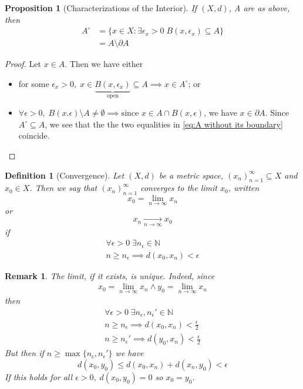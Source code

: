 \documentclass[11pt, oneside]{book}
\theoremstyle{break}
\newtheorem*{proof}{Proof}
\newtheorem{propo}{Proposition}[section]
\newtheorem*{remark}{Remark}
\newtheorem{defn}{Definition}[section]
\newcommand{\bb}[1]{\mathbb{#1}}			%
\begin{document}
\begin{propo}[Characterizations of the Interior]
	If $(X, d)$, A are as above, then
	\begin{align}
		A^{\circ} &= \{x \in X : \exists \epsilon_x > 0 \; B(x, \epsilon_x) \subseteq A \} \\
			&= A \setminus \partial A \label{eq:A without its boundary}
	\end{align}
\end{propo}

\begin{proof}
	Let $x \in A$. Then we have either
	\begin{itemize}
		\item for some $\epsilon_x > 0, \; x \in \underbrace{B(x, \epsilon_x)}_{\text{open}} \subseteq A \implies x \in A^{\circ}$; or

		\item $\forall \epsilon > 0, \; B(x. \epsilon) \setminus A \neq \emptyset \implies \text{since } x \in A \cap B(x, \epsilon)$, we have $x \in \partial A$. Since $A^{\circ} \subseteq A$, we see that the the two equalities in \autoref{eq:A without its boundary} coincide.
	\end{itemize}
\end{proof}

\begin{defn}[Convergence]
	Let $(X, d)$ be a metric space, $(x_n)_{n = 1}^\infty \subseteq X$ and $x_0 \in X$. Then we say that $(x_n)_{n = 1}^\infty$ converges to the limit $x_0$, written
	\begin{equation}
		x_0 = \lim_{n \to \infty} x_n
	\end{equation}
	or
	\begin{equation}
		x_n \underset{n \to \infty}{\to} x_0
	\end{equation}
	if
	\begin{gather*}
		\forall \epsilon > 0 \; \exists n_\epsilon \in \bb{N} \\
		n \geq n_\epsilon \implies d(x_0, x_n) < \epsilon
	\end{gather*}
\end{defn}

\begin{remark}
	The limit, if it exists, is unique. Indeed, since
	\begin{gather*}
		x_0 = \lim_{n \to \infty} x_n \land y_0 = \lim_{n \to \infty} x_n
	\end{gather*}
	then
	\begin{gather*}
		\forall \epsilon > 0 \; \exists n_\epsilon, n_\epsilon' \in \bb{N} \\
		n \geq n_\epsilon \implies d(x_0, x_n) < \frac{\epsilon}{2} \\
		n \geq n_\epsilon' \implies d(y_0, x_n) < \frac{\epsilon}{2} 
	\end{gather*}
	But then if $n \geq \max\{n_\epsilon, n_\epsilon'\}$ we have
	\begin{equation*}
		d(x_0, y_0) \leq d(x_0, x_n) + d(x_n, y_0) < \epsilon
	\end{equation*}
	If this holds for all $\epsilon > 0, \; d(x_0, y_0) = 0$ so $x_0 = y_0$.
\end{remark}
\end{document}
